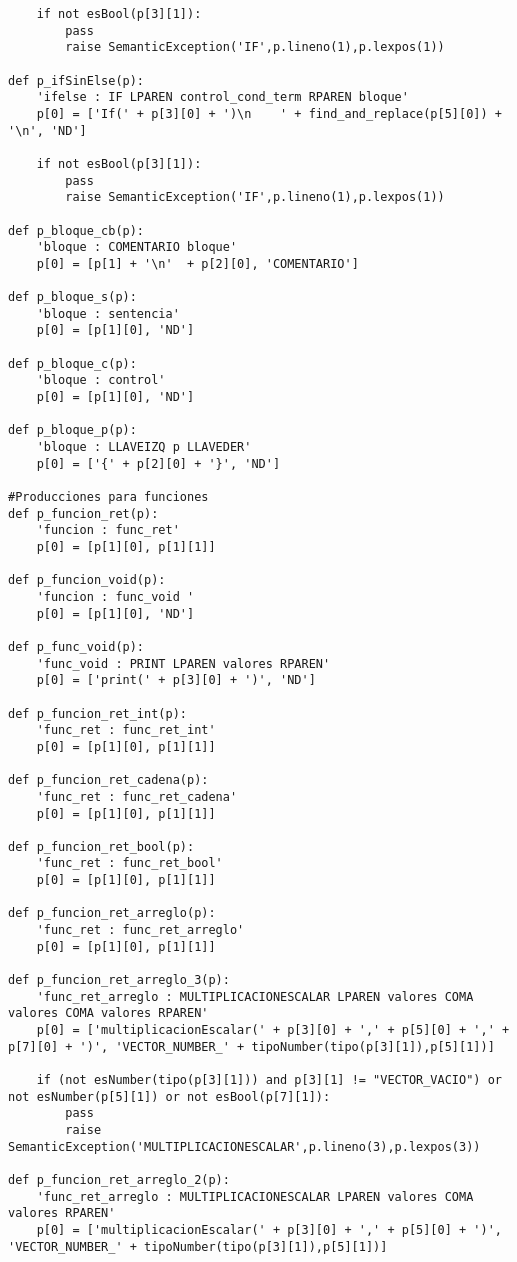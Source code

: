 \begin{verbatim}
    if not esBool(p[3][1]):
        pass
        raise SemanticException('IF',p.lineno(1),p.lexpos(1))

def p_ifSinElse(p):
    'ifelse : IF LPAREN control_cond_term RPAREN bloque'
    p[0] = ['If(' + p[3][0] + ')\n    ' + find_and_replace(p[5][0]) + '\n', 'ND']

    if not esBool(p[3][1]):
        pass
        raise SemanticException('IF',p.lineno(1),p.lexpos(1))

def p_bloque_cb(p):
    'bloque : COMENTARIO bloque'
    p[0] = [p[1] + '\n'  + p[2][0], 'COMENTARIO']

def p_bloque_s(p):
    'bloque : sentencia'
    p[0] = [p[1][0], 'ND']

def p_bloque_c(p):
    'bloque : control'
    p[0] = [p[1][0], 'ND']

def p_bloque_p(p):
    'bloque : LLAVEIZQ p LLAVEDER'
    p[0] = ['{' + p[2][0] + '}', 'ND']

#Producciones para funciones
def p_funcion_ret(p):
    'funcion : func_ret'
    p[0] = [p[1][0], p[1][1]]

def p_funcion_void(p):
    'funcion : func_void '
    p[0] = [p[1][0], 'ND']

def p_func_void(p):
    'func_void : PRINT LPAREN valores RPAREN'
    p[0] = ['print(' + p[3][0] + ')', 'ND']

def p_funcion_ret_int(p):
    'func_ret : func_ret_int'
    p[0] = [p[1][0], p[1][1]]

def p_funcion_ret_cadena(p):
    'func_ret : func_ret_cadena'
    p[0] = [p[1][0], p[1][1]]

def p_funcion_ret_bool(p):
    'func_ret : func_ret_bool'
    p[0] = [p[1][0], p[1][1]]

def p_funcion_ret_arreglo(p):
    'func_ret : func_ret_arreglo'
    p[0] = [p[1][0], p[1][1]]

def p_funcion_ret_arreglo_3(p):
    'func_ret_arreglo : MULTIPLICACIONESCALAR LPAREN valores COMA valores COMA valores RPAREN'
    p[0] = ['multiplicacionEscalar(' + p[3][0] + ',' + p[5][0] + ',' + p[7][0] + ')', 'VECTOR_NUMBER_' + tipoNumber(tipo(p[3][1]),p[5][1])]

    if (not esNumber(tipo(p[3][1])) and p[3][1] != "VECTOR_VACIO") or not esNumber(p[5][1]) or not esBool(p[7][1]):
        pass
        raise SemanticException('MULTIPLICACIONESCALAR',p.lineno(3),p.lexpos(3))

def p_funcion_ret_arreglo_2(p):
    'func_ret_arreglo : MULTIPLICACIONESCALAR LPAREN valores COMA valores RPAREN'
    p[0] = ['multiplicacionEscalar(' + p[3][0] + ',' + p[5][0] + ')', 'VECTOR_NUMBER_' + tipoNumber(tipo(p[3][1]),p[5][1])]


\end{verbatim}
